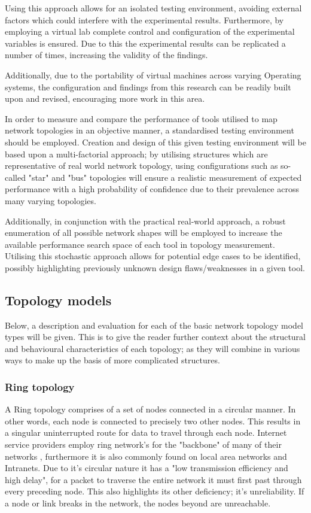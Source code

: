 Using this approach allows for an isolated testing environment, avoiding external factors which could interfere with the experimental results. Furthermore, by employing a virtual lab complete control and configuration of the experimental variables is ensured. Due to this the experimental results can be replicated a number of times, increasing the validity of the findings. 

Additionally, due to the portability of virtual machines across varying Operating systems, the configuration and findings from this research can be readily built upon and revised, encouraging more work in this area.

In order to measure and compare the performance of tools utilised to map network topologies in an objective manner, a standardised testing environment should be employed. Creation and design of this given testing environment will be based upon a multi-factorial approach; by utilising structures which are representative of real world network topology, using configurations such as so-called "star" and "bus" topologies will ensure a realistic measurement of expected performance with a high probability of confidence due to their prevalence across many varying topologies. 

Additionally, in conjunction with the practical real-world approach, a robust enumeration of all possible network shapes will be employed to increase the available performance search space of each tool in topology measurement. Utilising this stochastic approach allows for potential edge cases to be identified, possibly highlighting previously unknown design flaws/weaknesses in a given tool. 

\subsection{Topology models}
Below, a description and evaluation for each of the basic network topology model types will be given. This is to give the reader further context about the structural and behavioural characteristics of each topology; as they will combine in various ways to make up the basis of more complicated structures. 

\subsubsection{Ring topology}
A Ring topology comprises of a set of nodes connected in a circular manner. In other words, each node is connected to precisely two other nodes. This results in a singular uninterrupted route for data to travel through each node. Internet service providers employ ring network's for the "backbone" of many of their networks \cite{ring_network}, furthermore it is also commonly found on local area networks and Intranets. Due to it's circular nature it has a "low transmission efficiency and high delay", for a packet to traverse the entire network it must first past through every preceding node. This also highlights its other deficiency; it's unreliability. If a node or link breaks in the network, the nodes beyond are unreachable. \cite{ring_network}

